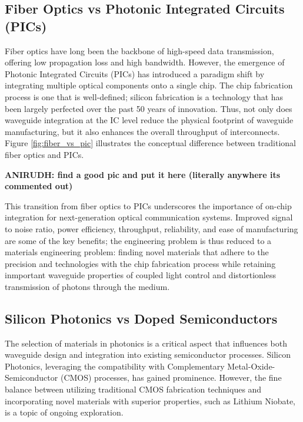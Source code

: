 \documentclass[10pt]{article}
\begin{document}
\subsection{Fiber Optics vs Photonic Integrated Circuits (PICs)}

Fiber optics have long been the backbone of high-speed data transmission, offering low propagation loss and high bandwidth. However, the emergence of Photonic Integrated Circuits (PICs) has introduced a paradigm shift by integrating multiple optical components onto a single chip. The chip fabrication process is one that is well-defined; silicon fabrication is a technology that has been largely perfected over the past 50 years of innovation. Thus, not only does waveguide integration at the IC level reduce the physical footprint of waveguide manufacturing, but it also enhances the overall throughput of interconnects. Figure \ref{fig:fiber_vs_pic} illustrates the conceptual difference between traditional fiber optics and PICs.

\textbf{ANIRUDH: find a good pic and put it here (literally anywhere its commented out)}

This transition from fiber optics to PICs underscores the importance of on-chip integration for next-generation optical communication systems. Improved signal to noise ratio, power efficiency, throughput, reliability, and ease of manufacturing are some of the key benefits; the engineering problem is thus reduced to a 
materials engineering problem: finding novel materials that adhere to the precision and technologies with the chip fabrication process while retaining inmportant waveguide 
properties of coupled light control and distortionless transmission of photons through the medium.

\subsection{Silicon Photonics vs Doped Semiconductors}

The selection of materials in photonics is a critical aspect that influences both waveguide design and integration into existing semiconductor processes. 
Silicon Photonics, leveraging the compatibility with Complementary Metal-Oxide-Semiconductor (CMOS) processes, has gained prominence. However, the fine balance between utilizing traditional CMOS fabrication techniques and incorporating novel materials with superior properties, such as Lithium Niobate, is a topic of ongoing exploration.
\end{document}
